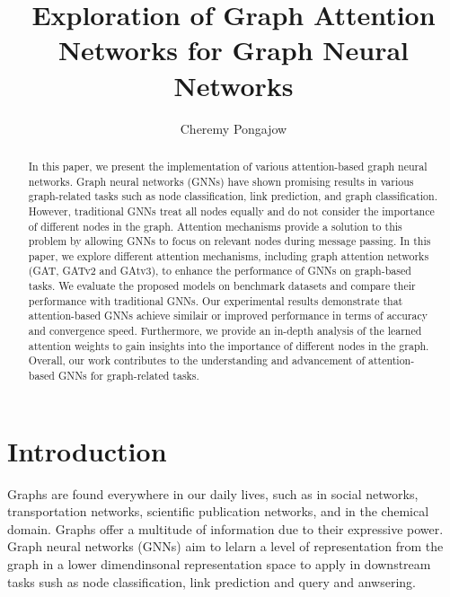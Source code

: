 \documentclass[runningheads]{llncs}
\begin{document}
%
%
\author{Cheremy Pongajow}
%
%

\title{Exploration of Graph Attention Networks for Graph Neural Networks}
%
\maketitle              %
%
\begin{abstract}
In this paper, we present the implementation of various 
attention-based graph neural networks. Graph neural networks (GNNs) have shown
promising results in various graph-related tasks such as node classification, 
link prediction, and graph classification. However, traditional GNNs treat all 
nodes equally and do not consider the importance of different nodes in the graph. 
Attention mechanisms provide a solution to this problem by allowing GNNs to focus 
on relevant nodes during message passing. In this paper, we explore different attention 
mechanisms, including graph attention networks (GAT, GATv2 and GAtv3), to enhance the performance of GNNs 
on graph-based tasks. We evaluate the proposed models on benchmark datasets and compare 
their performance with traditional GNNs. Our experimental results demonstrate that attention-based 
GNNs achieve similair or improved performance in terms of accuracy and convergence speed. Furthermore, 
we provide an in-depth analysis of the learned attention weights to gain insights into 
the importance of different nodes in the graph. Overall, our work contributes to the
understanding and advancement of attention-based GNNs for graph-related tasks.

\end{abstract}
%
%
%
\section{Introduction}
Graphs are found everywhere in our daily lives, such as in social networks,
transportation networks, scientific publication networks, and in the chemical
domain. Graphs offer a multitude of information due to their expressive
power. Graph neural networks (GNNs) aim to lelarn a level of representation 
from the graph in a lower dimendinsonal representation space to apply 
in downstream tasks sush as node classification, link prediction and 
query and anwsering. 
\end{document}
